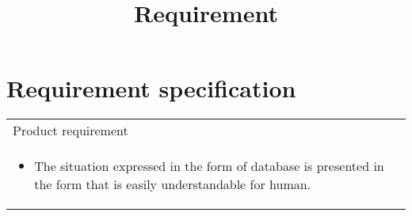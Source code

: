 \documentclass{report}
\begin{document}
\title{Requirement}
\maketitle 

\section{Requirement specification}
\begin{table}[h]
\begin{tabular}{| p{12cm} |}
	\hline
	Product requirement \\
	\begin{itemize}
	\item
	The situation expressed in the form of database is presented in the form that is easily understandable for human.
	\end{itemize}
	\\


\end{tabular}
\end{table}
\end{document}
